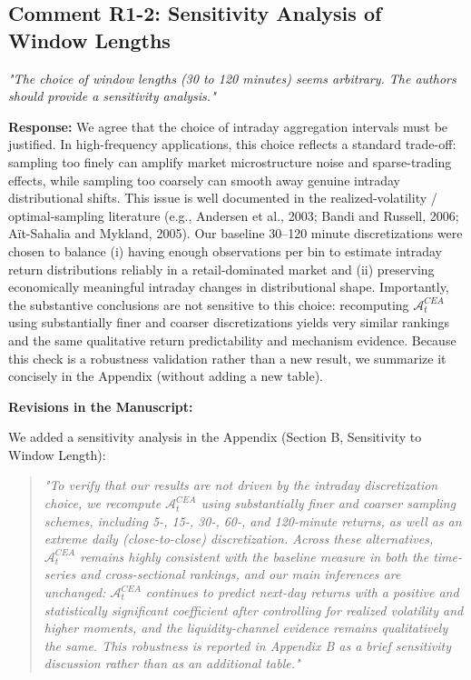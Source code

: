 \documentclass[12pt]{article}
\begin{document}
\subsection*{Comment R1-2: Sensitivity Analysis of Window Lengths}
\textit{"The choice of window lengths (30 to 120 minutes) seems arbitrary. The authors should provide a sensitivity analysis."}

\begin{highlightbox}
\textbf{Response:} We agree that the choice of intraday aggregation intervals must be justified. In high-frequency applications, this choice reflects a standard trade-off: sampling too finely can amplify market microstructure noise and sparse-trading effects, while sampling too coarsely can smooth away genuine intraday distributional shifts. This issue is well documented in the realized-volatility / optimal-sampling literature (e.g., Andersen et al., 2003; Bandi and Russell, 2006; A{\"i}t-Sahalia and Mykland, 2005). Our baseline 30--120 minute discretizations were chosen to balance (i) having enough observations per bin to estimate intraday return distributions reliably in a retail-dominated market and (ii) preserving economically meaningful intraday changes in distributional shape. Importantly, the substantive conclusions are not sensitive to this choice: recomputing $\mathcal{A}^{CEA}_t$ using substantially finer and coarser discretizations yields very similar rankings and the same qualitative return predictability and mechanism evidence. Because this check is a robustness validation rather than a new result, we summarize it concisely in the Appendix (without adding a new table).
\end{highlightbox}

\begin{highlightbox}
\textbf{Revisions in the Manuscript:}

We added a sensitivity analysis in the Appendix (Section B, Sensitivity to Window Length):
\vspace{0.2cm}
\begin{quote}
\itshape "To verify that our results are not driven by the intraday discretization choice, we recompute $\mathcal{A}^{CEA}_t$ using substantially finer and coarser sampling schemes, including 5-, 15-, 30-, 60-, and 120-minute returns, as well as an extreme daily (close-to-close) discretization. Across these alternatives, $\mathcal{A}^{CEA}_t$ remains highly consistent with the baseline measure in both the time-series and cross-sectional rankings, and our main inferences are unchanged: $\mathcal{A}^{CEA}_t$ continues to predict next-day returns with a positive and statistically significant coefficient after controlling for realized volatility and higher moments, and the liquidity-channel evidence remains qualitatively the same. This robustness is reported in Appendix B as a brief sensitivity discussion rather than as an additional table."
\end{quote}
\end{highlightbox}
\end{document}
